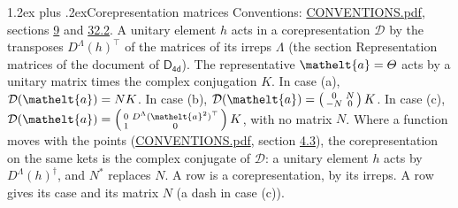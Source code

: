 \documentclass[10pt,a4paper]{article}
\makeatletter
\renewcommand\section{\@startsection{section}{1}{\z@}{-3ex plus -1ex minus -.2ex}%
  {1.2ex plus .2ex}{\normalfont\large\sffamily\bfseries\color{parttitle}}}
\numberwithin{equation}{section}
\newcommand{\eltfont}[1]{{\let\sigma\eltsigma\mathelt{#1}}}
\newcommand{\grp}[1]{\mathsf{#1}}
\newcommand{\elt}[1]{\eltfont{#1}}
\makeatother
\begin{document}
\section{Corepresentation matrices}\label{s:corep_matrices}
Conventions: \href{../../CONVENTIONS.pdf}{CONVENTIONS.pdf}, sections \href{../../../rotation/CONVENTIONS.pdf\#conv.9}{9} and \href{../../CONVENTIONS.pdf\#conv.32.2}{32.2}.
A unitary element $h$ acts in a corepresentation $\mathcal{D}$ by the transposes $D^{\Lambda}(h)^{\top}$ of the matrices of its irreps $\Lambda$ (the section Representation matrices of the document of \href{../../../rotation/data/pdf/D4d.pdf}{$\grp{D_{4d}}$}). The representative $\elt{a} = \varTheta$ acts by a unitary matrix times the complex conjugation $K$.
In case (a), $\mathcal{D}(\elt{a}) = NK$. In case (b), $\mathcal{D}(\elt{a}) = \left(\begin{smallmatrix} 0 & N \\ -N & 0 \end{smallmatrix}\right) K$. In case (c), $\mathcal{D}(\elt{a}) = \left(\begin{smallmatrix} 0 & D^{\Lambda}(\elt{a}^2)^{\top} \\ 1 & 0 \end{smallmatrix}\right) K$, with no matrix $N$.
Where a function moves with the points (\href{../../CONVENTIONS.pdf}{CONVENTIONS.pdf}, section \href{../../../rotation/CONVENTIONS.pdf\#conv.4.3}{4.3}), the corepresentation on the same kets is the complex conjugate of $\mathcal{D}$: a unitary element $h$ acts by $D^{\Lambda}(h)^{\dagger}$, and $N^{*}$ replaces $N$.
A row is a corepresentation, by its irreps. A row gives its case and its matrix $N$ (a dash in case (c)).
\end{document}
